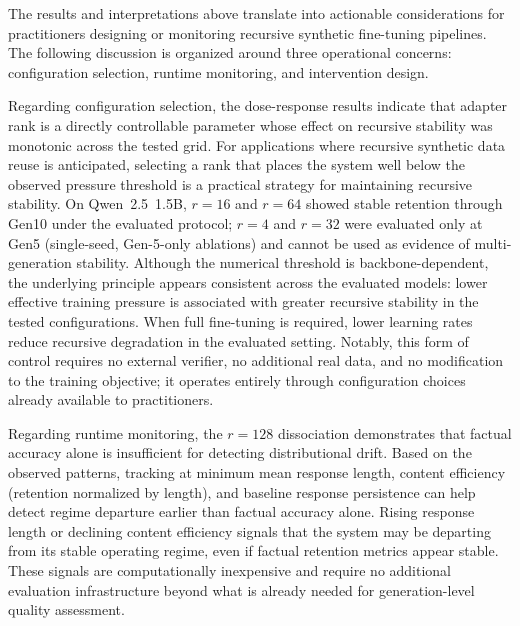 \documentclass[a4paper,fleqn]{cas-dc}
\newif\ifshowchanges
\newcommand{\rev}[1]{\ifshowchanges{\color{blue}#1}\else{#1}\fi}
\begin{document}
The results and interpretations above translate into actionable considerations
for practitioners designing or monitoring recursive synthetic fine-tuning
pipelines. The following discussion is organized around three operational concerns: configuration
selection, runtime monitoring, and intervention design.

Regarding configuration selection, the dose-response results indicate that
adapter rank is a directly controllable parameter \rev{whose effect on recursive stability was monotonic across the tested grid}. For applications where recursive synthetic data reuse is
anticipated, selecting a rank that places the system well below the observed
pressure threshold is a practical strategy for maintaining recursive stability.
On Qwen~2.5~1.5B, $r=16$ and $r=64$ showed stable retention through Gen10 under the evaluated protocol; $r=4$ and $r=32$ were \rev{evaluated only at Gen5 (single-seed, Gen-5-only ablations)} and cannot be used as evidence of multi-generation stability. Although
the numerical threshold is backbone-dependent, the underlying principle appears
consistent across the evaluated models: lower effective training pressure is
associated with greater recursive stability in the tested configurations. When
full fine-tuning is required, lower learning rates reduce recursive degradation
in the evaluated setting. Notably, this form of control requires no external
verifier, no additional real data, and no modification to the training objective;
it operates entirely through configuration choices already available to
practitioners.

Regarding runtime monitoring, the $r=128$ dissociation demonstrates that factual
accuracy alone is insufficient for detecting distributional drift. Based on the
observed patterns, tracking at minimum mean response length, content efficiency
(retention normalized by length), and baseline response persistence can help
detect regime departure earlier than factual accuracy alone. Rising response
length or declining content efficiency signals that the system may be departing
from its stable operating regime, even if factual retention metrics appear
stable. These signals are computationally inexpensive and require no additional
evaluation infrastructure beyond what is already needed for generation-level
quality assessment.
\end{document}
